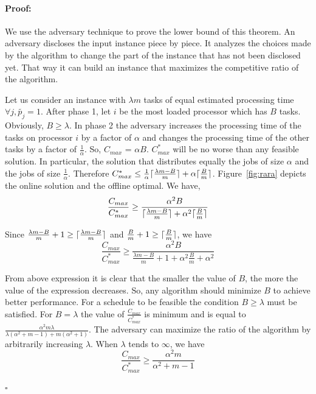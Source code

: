 \documentclass[12pt]{article}
\DeclarePairedDelimiter{\ceil}{\lceil}{\rceil}
\theoremstyle{mystyle}
\newenvironment{myproof}{\paragraph{Proof:}}{\hfill$\square$}
\begin{document}
   \begin{myproof}
     We use the adversary technique to prove the lower bound of this
     theorem. An adversary discloses the input instance piece by
     piece. It analyzes the choices made by the algorithm to change the
     part of the instance that has not been disclosed yet. That way it
     can build an instance that maximizes the competitive ratio of the
     algorithm.
    
     Let us consider an instance with $\lambda m$ tasks of equal
     estimated processing time $\forall j, \tilde{p_j} = 1$. After phase
     1, let $i$ be the most loaded processor which has $B$
     tasks. Obviously, $B \geq \lambda$. In phase 2 the adversary
     increases the processing time of the tasks on processor $i$ by a
     factor of $\alpha$ and changes the processing time of the other
     tasks by a factor of $\frac{1}{\alpha}$. So, $ C_{max}$ = $\alpha
     B$. ${C^{*}_{max}}$ will be no worse than any feasible solution. In
     particular, the solution that distributes equally the jobs of size
     $\alpha$ and the jobs of size $\frac{1}{\alpha}$. Therefore
     ${C^{*}_{max}} \leq \frac{1}{\alpha }\ceil {\frac{\lambda m - B
       }{m}}+ \alpha\ceil{\frac{B}{m}} $.  Figure~\ref{fig:rara} depicts
     the online solution and the offline optimal. We have,
    \begin{equation}\nonumber
      \frac{C_{max}}{C^{*}_{max}}
      \geq \frac{\alpha^{2} B  }{\ceil{\frac{
           \lambda m - B }{m}}+\alpha^2\ceil{\frac{B}{m}}}
    \end{equation}
      
    Since $\frac{ \lambda m - B }{m} +1 \geq\ceil{\frac{ \lambda m - B
      }{m}}$ and $\frac{B}{m}+1\geq\ceil{\frac{B}{m}}$, we have
    \begin{equation}\nonumber
      \frac{C_{max}}{C^{*}_{max}}
      \geq \frac{\alpha^{2} B  }{\frac{
          \lambda m - B }{m}+1+\alpha^2\frac{B}{m}+\alpha^{2}}
    \end{equation}
    
    From above expression it is clear that the smaller the value of $B$, the more the
    value of the expression decreases. So, any algorithm should minimize
    $B$ to achieve better performance.  For a schedule to be feasible the
    condition $B \geq \lambda$ must be satisfied. For $B = \lambda$ the
    value of $\frac{C_{max}}{C^{*}_{max}}$ is minimum and is equal to
    $\frac{\alpha^{2} m \lambda }{\lambda(\alpha^{2}+m-1)+
      m(\alpha^{2}+1)}$. The adversary can maximize the ratio of the
    algorithm by arbitrarily increasing $\lambda$. When $\lambda$ tends
    to $\infty$, we have
    \begin{equation}\nonumber
          \frac{C_{max}}{C^{*}_{max}}
          \geq \frac{\alpha^{2}m  }{\alpha^{2}+m-1}
        \end{equation}
    

\end{myproof}
\end{document}
